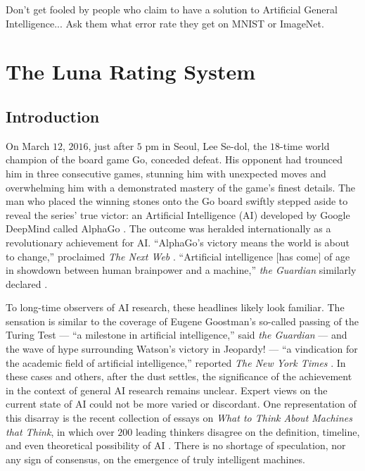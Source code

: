 \begin{savequote}[75mm]
Don't get fooled by people who claim to have a solution to Artificial General Intelligence... Ask them what error rate they get on MNIST or ImageNet.
\end{savequote}


\chapter{The Luna Rating System}

\section{Introduction}

On March $12$, $2016$, just after $5$ pm in Seoul, Lee Se-dol, the $18$-time world champion of the board game Go, conceded defeat. His opponent had trounced him in three consecutive games, stunning him with unexpected moves and overwhelming him with a demonstrated mastery of the game's finest details. The man who placed the winning stones onto the Go board swiftly stepped aside to reveal the series' true victor: an Artificial Intelligence (AI) developed by Google DeepMind called AlphaGo \citep{silver2016mastering}. The outcome was heralded internationally as a revolutionary achievement for AI. ``AlphaGo's victory means the world is about to change,'' proclaimed \textit{The Next Web} \citep{1_nextweb_2016}. ``Artificial intelligence [has come] of age in showdown between human brainpower and a machine,'' \textit{the Guardian} similarly declared \citep{1_the_guardian_2016}. 

To long-time observers of AI research, these headlines likely look familiar. The sensation is similar to the coverage of Eugene Goostman's so-called passing of the Turing Test --- ``a milestone in artificial intelligence,'' said \textit{the Guardian} \citep{1_the_guardian_2014, occasional_pamphlet_2014} --- and the wave of hype surrounding Watson's victory in Jeopardy! --- ``a vindication for the academic field of artificial intelligence,'' reported \textit{The New York Times} \citep{1_newyorktimes_2011}. In these cases and others, after the dust settles, the significance of the achievement in the context of general AI research remains unclear. Expert views on the current state of AI could not be more varied or discordant. One representation of this disarray is the recent collection of essays on \textit{What to Think About Machines that Think}, in which over $200$ leading thinkers disagree on the definition, timeline, and even theoretical possibility of AI \citep{edge2016what}. There is no shortage of speculation, nor any sign of consensus, on the emergence of truly intelligent machines.

